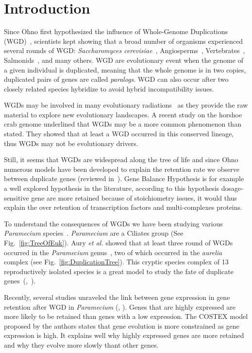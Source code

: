 \section*{Introduction}

Since Ohno first hypothesized the influence of Whole-Genome Duplications (WGD)~\citep{ohno_enormous_1970}, scientists kept showing that a broad number of organisms experienced several rounds of WGD: \textit{Saccharomyces cerevisiae}~\citep{fares_roles_2013}, Angiosperms~\citep{arrigo_rarely_2012}, Vertebrates~\citep{dehal_two_2005}, Salmonids~\citep{alexandrou_genome_2013}, and many others. WGD are evolutionary event when the genome of a given individual is duplicated, meaning that the whole genome is in two copies, duplicated pairs of genes are called \textit{paralogs}. WGD can also occur after two closely related species hybridize to avoid hybrid incompatibility issues.

WGDs may be involved in many evolutionary radiations~\citep{alexandrou_genome_2013} as they provide the raw material to explore new evolutionary landscapes. A recent study on the horshoe crab genome underlined that WGDs may be a more common phenomenon than stated. They showed that at least a WGD occurred in this conserved lineage, thus WGDs may not be evolutionary drivers.

Still, it seems that WGDs are widespread along the tree of life and since Ohno numerous models have been developed to explain the retention rate we observe between duplicate genes (reviewed in~\citet{innan_evolution_2010}). Gene Balance Hypothesis is for example a well explored hypothesis in the literature, according to this hypothesis dosage-sensitive gene are more retained because of stoichiometry issues, it would thus explain the over retention of transcription factors and multi-complexes proteins.

To understand the consequences of WGDs we have been studying various \textit{Paramecium} species~\citep{beisson_paramecium_2010}. \textit{Paramecium} are a Ciliates group (See Fig.~\ref{fig:TreeOfEuk}). Aury \textit{et al.} showed that at least three round of WGDs occurred in the \textit{Paramecium} genus~\citep{aury_global_2006}, two of which occurred in the \textit{aurelia} complex (see Fig.~\ref{fig:DuplicationTree}). This cryptic species complex of 13 reproductively isolated species is a great model to study the fate of duplicate genes~(\citealt{catania_genetic_2009},~\citealt{mcgrath_insights_2014}).

Recently, several studies unraveled the link between gene expression in gene retention after WGD in \textit{Paramecium} (\citealt{gout_relationship_2010}, \citealt{arnaiz_gene_2010}). Genes that are highly expressed are more likely to be retained than genes with a low expression. The COSTEX model proposed by the authors states that gene evolution is more constrained as gene expression is high. It explains well why highly expressed genes are more retained and why they evolve more slowly thant other genes.

